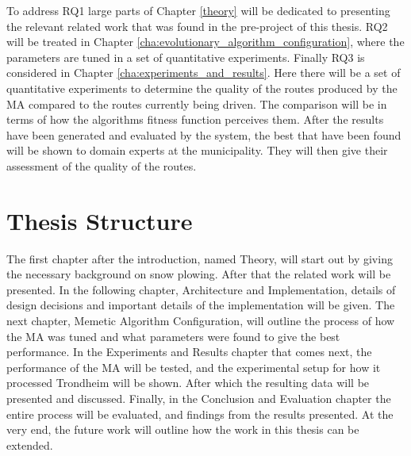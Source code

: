 To address RQ1 large parts of Chapter \ref{theory} will be dedicated to presenting the relevant related work that was found in the pre-project of this thesis. RQ2 will be treated in Chapter \ref{cha:evolutionary_algorithm_configuration}, where the parameters are tuned in a set of quantitative experiments. Finally RQ3 is considered in Chapter \ref{cha:experiments_and_results}. Here there will be a set of quantitative experiments to determine the quality of the routes produced by the MA compared to the routes currently being driven. The comparison will be in terms of how the algorithms fitness function perceives them. After the results have been generated and evaluated by the system, the best that have been found will be shown to domain experts at the municipality. They will then give their assessment of the quality of the routes.

\section{Thesis Structure}

The first chapter after the introduction, named Theory, will start out by giving the necessary background on snow plowing. After that the related work will be presented. In the following chapter, Architecture and Implementation, details of design decisions and important details of the implementation will be given. The next chapter, Memetic Algorithm Configuration, will outline the process of how the MA was tuned and what parameters were found to give the best performance. In the Experiments and Results chapter that comes next, the performance of the MA will be tested, and the experimental setup for how it processed Trondheim will be shown. After which the resulting data will be presented and discussed. Finally, in the Conclusion and Evaluation chapter the entire process will be evaluated, and findings from the results presented. At the very end, the future work will outline how the work in this thesis can be extended.

\cleardoublepage
